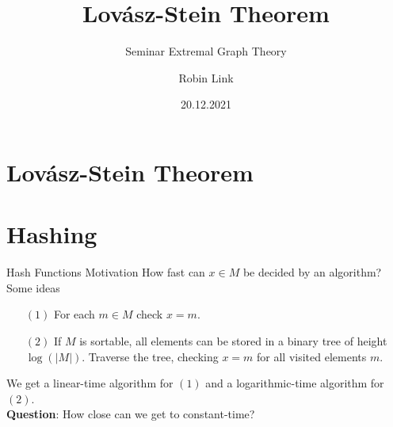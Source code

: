 \documentclass[10pt]{beamer}
\title{Lovász-Stein Theorem}
\subtitle{Seminar Extremal Graph Theory}
\date{20.12.2021}
\institute{Advisors: \newline Prof. Dr. Maria Axenovich \& Dr. Alexander Neal Riasanovsky}
\author{Robin Link}
\begin{document}
\maketitle

\section{Lovász-Stein Theorem}

\section{Hashing}

\begin{frame}[fragile]{Hash Functions Motivation}
    How fast can $ x \in M $ be decided by an algorithm?
    \\
    \vspace{1em}
    Some ideas
    \begin{itemize}
        \item[$ (1) $] For each $ m \in M $ check $ x = m $.
        \item[$ (2) $] If $ M $ is sortable, all elements can be stored in a binary tree of height $ \log (|M|)$.
        Traverse the tree, checking $ x = m $ for all visited elements $ m $.
    \end{itemize}
    We get a linear-time algorithm for $ (1) $ and a logarithmic-time algorithm for $ (2) $.
    \\
    \vfill
    \textbf{Question}: How close can we get to constant-time?
\end{frame}
\end{document}
